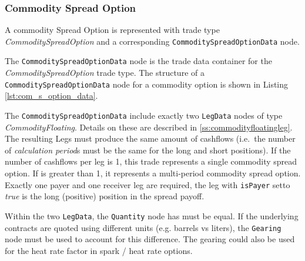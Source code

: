 \subsubsection{Commodity Spread Option}
\label{ss:input_commodity_spread_option}

A commodity Spread Option is represented with trade type  \emph{CommoditySpreadOption} and a corresponding
\lstinline!CommoditySpreadOptionData! node.

The \lstinline!CommoditySpreadOptionData! node is the trade data container for the \emph{CommoditySpreadOption} trade type.
The structure of a \lstinline!CommoditySpreadOptionData! node for a commodity option is shown in Listing \ref{lst:com_s_option_data}.

The \lstinline!CommoditySpreadOptionData! include exactly two \lstinline!LegData! nodes of type \emph{CommodityFloating}.
Details on these are described in \ref{ss:commodityfloatingleg}.
The resulting Legs must produce the same amount of cashflows (i.e.~the number of \emph{calculation period}s must be the same for the long and short positions).
If the number of cashflows per leg is 1, this trade represents a single commodity spread option.
If is greater than 1, it represents a multi-period commodity spread option.
Exactly one payer and one receiver leg are required, the leg with \lstinline!isPayer! setto \emph{true} is the long (positive) position in the spread payoff. 

Within the two \lstinline!LegData!, the \lstinline!Quantity! node has must be equal.
If the underlying contracts are quoted using different units (e.g. barrels vs liters), the \lstinline!Gearing! node must be used to account for this difference. The gearing could also be used for the heat rate factor in spark / heat rate options.

